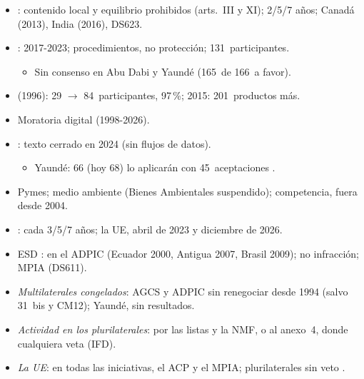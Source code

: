 \documentclass{article}
\begin{document}
\begin{columnas}
\begin{itemize}
\item {}: contenido local y equilibrio prohibidos (arts.~III y XI); 2/5/7 años; Canadá (2013), India (2016), DS623.
\item {}: 2017-2023; procedimientos, no protección; 131~participantes.
  \begin{itemize}
  \item Sin consenso en Abu Dabi y Yaundé (165~de 166~a favor).
  \end{itemize}
\end{itemize}
\begin{itemize}
\item {} (1996): 29 $\to$ 84~participantes, 97\,\%; 2015: 201~productos más.
\item Moratoria digital (1998-2026).
\item {}: texto cerrado en 2024 (sin flujos de datos).
  \begin{itemize}
  \item Yaundé: 66 (hoy 68) lo aplicarán con 45~aceptaciones .
  \end{itemize}
\item Pymes; medio ambiente (Bienes Ambientales suspendido); competencia, fuera desde 2004.
\end{itemize}

\begin{itemize}
\item {}: cada 3/5/7 años; la UE, abril de 2023 y diciembre de 2026.
\item ESD :  en el ADPIC (Ecuador 2000, Antigua 2007, Brasil 2009); no infracción; MPIA (DS611).
\end{itemize}

\begin{itemize}
\item \emph{Multilaterales congelados}: AGCS y ADPIC sin renegociar desde 1994 (salvo 31~bis y CM12); Yaundé, sin resultados.
\item \emph{Actividad en los plurilaterales}: por las listas y la NMF, o al anexo~4, donde cualquiera veta (IFD).
\item \emph{La UE}: en todas las iniciativas, el ACP y el MPIA; plurilaterales sin veto .
\end{itemize}


\end{columnas}
\end{document}
